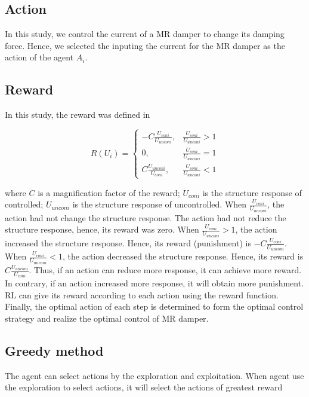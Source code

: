\subsection{Action}

In this study, we control the current of a MR damper to change its damping force. Hence, we selected the inputing the current for the MR damper as the action of the agent $A_i$. 
\subsection{Reward}

In this study, the reward was defined in

\begin{equation}
R(U_i)=
\begin{cases}
-C \frac{U_{coni}}{U_{unconi}},  & \frac{U_{coni}}{U_{unconi}} > 1 \\
0, & \frac{U_{coni}}{U_{unconi}} = 1 \\
C \frac{U_{unconi}}{U_{coni}}, & \frac{U_{coni}}{U_{unconi}} < 1 
\end{cases}
\end{equation}

where $C$ is a magnification factor of the reward; $U_{coni}$ is the structure response of controlled; $U_{unconi}$ is the structure response of uncontrolled. When $ \frac{U_{coni}}{U_{unconi}} $, the action had not change the structure response. The action had not reduce the structure response, hence, its reward was zero. When $\frac{U_{coni}}{U_{unconi}} > 1$, the action increased the structure response. Hence, its reward (punishment) is $-C \frac{U_{coni}}{U_{unconi}}$. When $\frac{U_{coni}}{U_{unconi}} < 1$, the action decreased the structure response. Hence, its reward is $C \frac{U_{unconi}}{U_{coni}}$. Thus, if an action can reduce more response, it can achieve more reward. In contrary, if an action increased more response, it will obtain more punishment. RL can give its reward according to each action using the reward function. Finally, the optimal action of each step is determined to form the optimal control strategy and realize the optimal control of MR damper.

\subsection{Greedy method}
The agent can select actions by the exploration and exploitation. When agent use the exploration to select actions, it will select the actions of greatest reward

